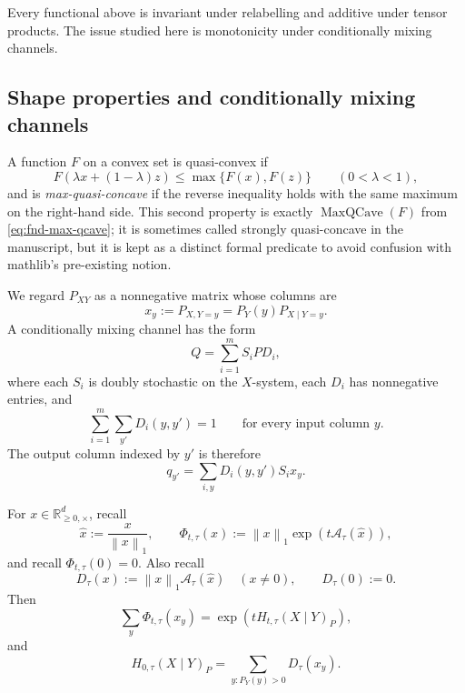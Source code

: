 \documentclass[9pt]{extarticle}
\theoremstyle{definition}
\theoremstyle{remark}
\newcommand{\R}{\mathbb R}
\newcommand{\A}{\mathcal A}
\newcommand{\norm}[1]{\left\lVert #1\right\rVert}
\begin{document}
Every functional above is invariant under relabelling and additive under
tensor products. The issue studied here is monotonicity under conditionally
mixing channels.

\subsection{Shape properties and conditionally mixing channels}

A function $F$ on a convex set is quasi-convex if
\[
 F(\lambda x+(1-\lambda)z)\leq\max\{F(x),F(z)\}
 \qquad(0<\lambda<1),
\]
and is \emph{max-quasi-concave} if the reverse inequality holds with the same
maximum on the right-hand side.  This second property is exactly
$\operatorname{MaxQCave}(F)$ from \cref{eq:fnd-max-qcave}; it is sometimes
called strongly quasi-concave in the manuscript, but it is kept as a distinct
formal predicate to avoid confusion with mathlib's pre-existing notion.

We regard $P_{XY}$ as a nonnegative matrix whose columns are
\[
 x_y:=P_{X,Y=y}=P_Y(y)P_{X\mid Y=y}.
\]
A conditionally mixing channel has the form
\begin{equation}
 Q=\sum_{i=1}^m S_iPD_i,
 \label{eq:conditional-channel}
\end{equation}
where each $S_i$ is doubly stochastic on the $X$-system, each $D_i$ has
nonnegative entries, and
\begin{equation}
 \sum_{i=1}^m\sum_{y'}D_i(y,y')=1
 \qquad\text{for every input column }y.
 \label{eq:D-normalisation}
\end{equation}
The output column indexed by $y'$ is therefore
\[
 q_{y'}=\sum_{i,y}D_i(y,y')S_i x_y.
\]

For $x\in\R^d_{\geq0,\times}$, recall
\begin{equation}
 \widehat x:=\frac{x}{\norm{x}_1},\qquad
 \Phi_{t,\tau}(x):=\norm{x}_1
 \exp\!\left(t\A_\tau(\widehat x)\right),
 \label{eq:column-functional}
\end{equation}
and recall $\Phi_{t,\tau}(0)=0$. Also recall
\begin{equation}
 D_\tau(x):=\norm{x}_1\A_\tau(\widehat x)
 \quad(x\neq0),\qquad D_\tau(0):=0.
 \label{eq:derivation-column}
\end{equation}
Then
\begin{equation}
 \sum_y\Phi_{t,\tau}(x_y)
 =\exp\!\left(tH_{t,\tau}(X\mid Y)_P\right),
 \label{eq:matrix-column-sum}
\end{equation}
and
\[
H_{0,\tau}(X\mid Y)_P=\sum_{y:P_Y(y)>0}D_\tau(x_y).
\]
\end{document}
